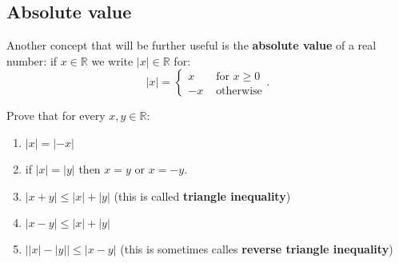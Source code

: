 \subsection{Absolute value}
Another concept that will be further useful is the \textbf{absolute value} of a real number:
if $x\in \mathbb R$ we write $|x|\in \mathbb R$ for:
$$|x| = \begin{cases}x &\text{ for } x \ge 0\\ -x &\text{ otherwise} \end{cases}.$$

\begin{exercise}
  Prove that for every $x,y\in \mathbb R$:
  \begin{enumerate}
    \item $|x|=|-x|$
    \item if $|x|=|y|$ then $x=y$ or $x=-y$.
    \item $|x+y| \le |x| + |y|$ (this is called \textbf{triangle inequality})
    \item $|x-y|\le |x| + |y|$
    \item $\left||x| - |y|\right|\le |x-y|$ (this is sometimes calles \textbf{reverse triangle inequality})
  \end{enumerate}
\end{exercise}
